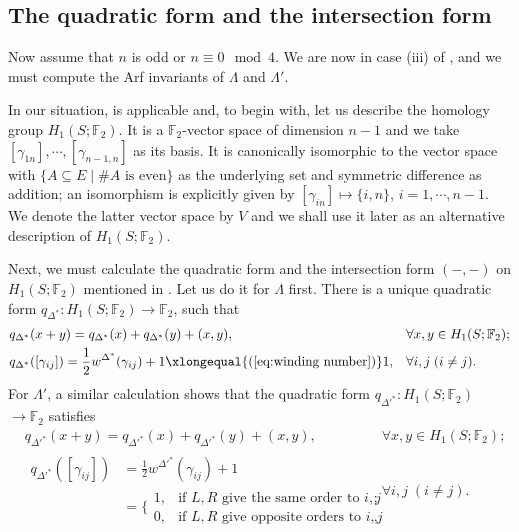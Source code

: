 \documentclass[11pt,reqno]{amsart}
\theoremstyle{plain}
\theoremstyle{definition}
\theoremstyle{remark}
\numberwithin{equation}{section}
\begin{document}
\subsection{The quadratic form and the intersection form}\label{subsec:quadratic form & intersection form}
\par Now assume that $n$ is odd or $n\equiv0\mod4$. We are now in case (iii) of \cite[loc. cit.]{APS}, and we must compute the Arf invariants of $\Lambda$ and $\Lambda'$.
\par In our situation, \cite[Lemma 7.5]{APS} is applicable and, to begin with, let us describe the homology group $H_1(S;\mathbb{F}_2)$. It is a $\mathbb{F}_2$-vector space of dimension $n-1$ and we take $[\gamma_{1n}],\cdots,[\gamma_{n-1,n}]$ as its basis. It is canonically isomorphic to the vector space with $\{A\subseteq E\mid\#A\text{ is even}\}$ as the underlying set and symmetric difference as addition; an isomorphism is explicitly given by $[\gamma_{in}]\mapsto\{i,n\}$, $i=1,\cdots,n-1$. We denote the latter vector space by $V$ and we shall use it later as an alternative description of $H_1(S;\mathbb{F}_2)$.
\par Next, we must calculate the quadratic form and the intersection form $(-,-)$ on $H_1(S;\mathbb{F}_2)$ mentioned in \cite[Lemma 7.5]{APS}. Let us do it for $\Lambda$ first. There is a unique quadratic form $q_{\Delta^*}:H_1(S;\mathbb{F}_2)\to\mathbb{F}_2$, such that
\[\begin{aligned}
    &q_{\Delta^*}(x+y)=q_{\Delta^*}(x)+q_{\Delta^*}(y)+(x,y),&&\forall x,y\in H_1(S;\mathbb{F}_2);\\
    &q_{\Delta^*}([\gamma_{ij}])=\frac12w^{\Delta^*}(\gamma_{ij})+1\xlongequal{(\ref{eq:winding number})}1,&&\forall i,j\;(i\ne j).
\end{aligned}\]
For $\Lambda'$, a similar calculation shows that the quadratic form $q_{\Delta'^*}:H_1(S;\mathbb{F}_2)$ $\to\mathbb{F}_2$ satisfies
\[\begin{aligned}
    &q_{\Delta'^*}(x+y)=q_{\Delta'^*}(x)+q_{\Delta'^*}(y)+(x,y),&&\forall x,y\in H_1(S;\mathbb{F}_2);\\
    &\begin{aligned}
        q_{\Delta'^*}([\gamma_{ij}])&=\frac12w^{\Delta'^*}(\gamma_{ij})+1\\
        &=\Bigg\{\!\!
        \begin{array}{ll}
        1, & \text{if $L,R$ give the same order to $i,j$}; \\
        0, & \text{if $L,R$ give opposite orders to $i,j$},
    \end{array}\end{aligned}
    &&\forall i,j\;(i\ne j).
\end{aligned}\]
\end{document}

